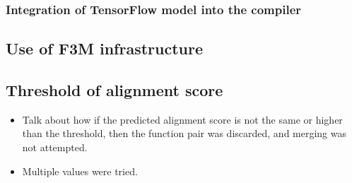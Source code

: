\subsubsection{Integration of TensorFlow model into the compiler}
\subsection{Use of F3M infrastructure}
\subsection{Threshold of alignment score}
\begin{itemize}
    \item Talk about how if the predicted alignment score is not the same or higher than the threshold, then the function pair was discarded, and merging was not attempted.
    \item  Multiple values were tried.
\end{itemize}









